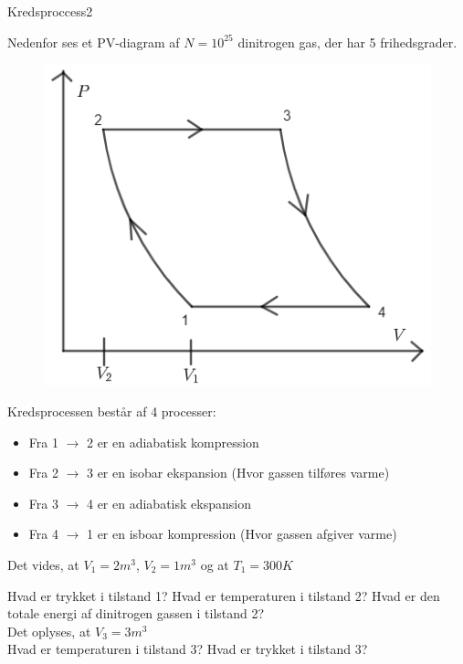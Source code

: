 \documentclass[crop=false, class=memoir]{standalone}
\begin{document}
\begin{opgave}{Kredsproccess2}

\noindent
Nedenfor ses et PV-diagram af $N=10^{25}$ dinitrogen gas, der har 5 frihedsgrader.

\begin{figure}[H]
    \centering
    \includegraphics[scale=0.8]{Termodynamik/fig/Term4.png}
\end{figure}

\noindent
Kredsprocessen består af 4 processer:

\begin{itemize}
    \item Fra 1 $\longrightarrow$ 2 er en adiabatisk kompression
    \item Fra 2 $\longrightarrow$ 3 er en isobar ekspansion (Hvor gassen tilføres varme)
    \item Fra 3 $\longrightarrow$ 4 er en adiabatisk ekspansion
    \item Fra 4 $\longrightarrow$ 1 er en isboar kompression (Hvor gassen afgiver varme)
\end{itemize}

\noindent
Det vides, at $V_1=2m^3$, $V_2=1m^3$ og at $T_1=300K$

\opg Hvad er trykket i tilstand 1?
\opg Hvad er temperaturen i tilstand 2?
\opg Hvad er den totale energi af dinitrogen gassen i tilstand 2? \\

\noindent 
Det oplyses, at $V_3=3m^3$ \\

\opg Hvad er temperaturen i tilstand 3?
\opg Hvad er trykket i tilstand 3? \\


\end{opgave}
\end{document}

